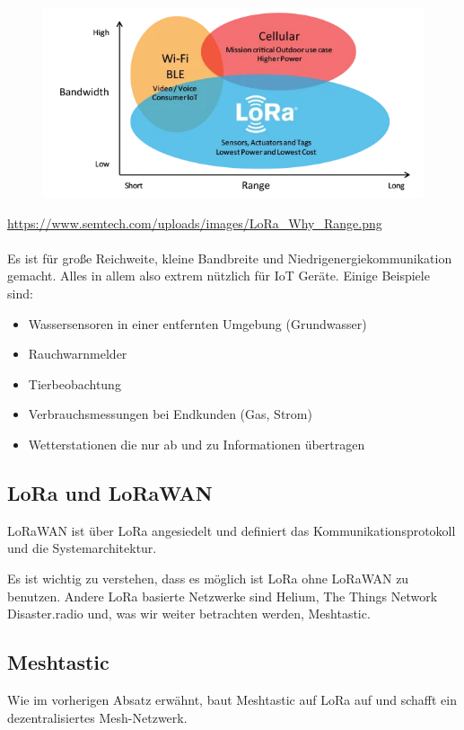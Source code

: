 \documentclass[12pt,a4paper]{article}
\begin{document}
\begin{figure}[h]
	\includegraphics[scale=0.7]{./Bilder/Technologie/bandwidth-vs-range.png}
\end{figure}
\url{https://www.semtech.com/uploads/images/LoRa_Why_Range.png}\\ \\
Es ist für große Reichweite, kleine Bandbreite und Niedrigenergiekommunikation gemacht. Alles in allem also extrem nützlich für IoT Geräte. Einige Beispiele sind:

\begin{itemize}
	\item Wassersensoren in einer entfernten Umgebung (Grundwasser)
	\item Rauchwarnmelder
	\item Tierbeobachtung
	\item Verbrauchsmessungen bei Endkunden (Gas, Strom)
	\item Wetterstationen die nur ab und zu Informationen übertragen
\end{itemize}
\newpage
\subsection{LoRa und LoRaWAN}

LoRaWAN ist über LoRa angesiedelt und definiert das Kommunikationsprotokoll und die Systemarchitektur.

Es ist wichtig zu verstehen, dass es möglich ist LoRa ohne LoRaWAN zu benutzen. Andere LoRa basierte Netzwerke sind Helium, The Things Network Disaster.radio und, was wir weiter betrachten werden, Meshtastic.

\subsection{Meshtastic}
Wie im vorherigen Absatz erwähnt, baut Meshtastic auf LoRa auf und schafft ein dezentralisiertes Mesh-Netzwerk.
\end{document}
